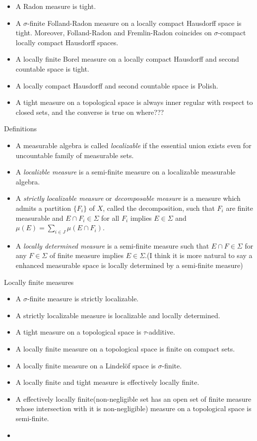 \documentclass{../../large}
\begin{document}
\begin{itemize}
\item A Radon measure is tight.
\item A $\sigma$-finite Folland-Radon measure on a locally compact Hausdorff space is tight. Moreover, Folland-Radon and Fremlin-Radon coincides on $\sigma$-compact locally compact Hausdorff spaces.
\item A locally finite Borel measure on a locally compact Hausdorff and second countable space is tight.
\item A locally compact Hausdorff and second countable space is Polish.
\item A tight measure on a topological space is always inner regular with respect to closed sets, and the converse is true on where???
\end{itemize}

Definitions
\begin{itemize}
\item A measurable algebra is called \emph{localizable} if the essential union exists even for uncountable family of measurable sets.
\item A \emph{localizble measure} is a semi-finite measure on a localizable measurable algebra.
\item A \emph{strictly localizable measure} or \emph{decomposable measure} is a measure which admits a partition $\{F_i\}$ of $X$, called the decomposition, such that $F_i$ are finite measurable and $E\cap F_i\in\Sigma$ for all $F_i$ implies $E\in\Sigma$ and $\mu(E)=\sum_{i\in J}\mu(E\cap F_i)$.
\item A \emph{locally determined measure} is a semi-finite measure such that $E\cap F\in\Sigma$ for any $F\in\Sigma$ of finite measure implies $E\in\Sigma$.(I think it is more natural to say a enhanced measurable space is locally determined by a semi-finite measure)
\end{itemize}

Locally finite measures
\begin{itemize}
\item A $\sigma$-finite measure is strictly localizable.
\item A strictly localizable measure is localizable and locally determined.
\item A tight measure on a topological space is $\tau$-additive.
\item A locally finite measure on a topological space is finite on compact sets.
\item A locally finite measure on a Lindel\"of space is $\sigma$-finite.
\item A locally finite and tight measure is effectively locally finite.
\item A effectively locally finite(non-negligible set has an open set of finite measure whose intersection with it is non-negligible) measure on a topological space is semi-finite.
\item
\end{itemize}
\end{document}
